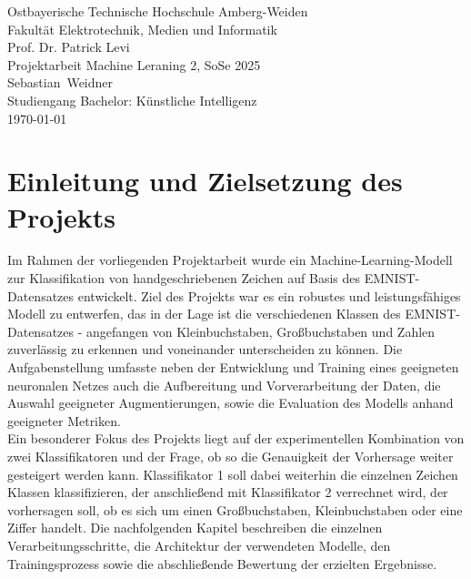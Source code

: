 \documentclass[12pt,oneside]{article}
\newcommand*{\IhrVornameEins}{Sebastian}
\newcommand*{\IhrNachnameEins}{Weidner}
\newcommand*{\IhrStudiengang}{Bachelor: Künstliche Intelligenz}
\newcommand*{\IhreArbeit}{Projektarbeit Machine Leraning 2, SoSe 2025}
\newcommand*{\IhrErstpruefer}{Prof. Dr. Patrick Levi}
\begin{document}
  \thispagestyle{empty}
  \originalTeX
  \begin{center}
 	\Large
 	Ostbayerische Technische Hochschule Amberg-Weiden\\
 Fakultät Elektrotechnik, Medien und Informatik\\[.8cm]
 \large \IhrErstpruefer\\[.8cm]
 \Large \IhreArbeit\\[.8cm]
 \large\IhrVornameEins\ \IhrNachnameEins\\[.8cm]
 \large Studiengang \IhrStudiengang\\[.8cm]
 \today\\[2.5cm]
  \end{center}
  
  \tableofcontents
  \clearpage
  \listoftables %
  \listoffigures %

  \clearpage
  
  
  \section{Einleitung und Zielsetzung des Projekts}
  Im Rahmen der vorliegenden Projektarbeit wurde ein Machine-Learning-Modell zur Klassifikation von handgeschriebenen Zeichen auf Basis des EMNIST-Datensatzes entwickelt. Ziel des Projekts war es ein robustes und leistungsfähiges Modell zu entwerfen, das in der Lage ist die verschiedenen Klassen des EMNIST-Datensatzes - angefangen von Kleinbuchstaben, Großbuchstaben und Zahlen zuverlässig zu erkennen und voneinander unterscheiden zu können. Die Aufgabenstellung umfasste neben der Entwicklung und Training eines geeigneten neuronalen Netzes auch die Aufbereitung und Vorverarbeitung der Daten, die Auswahl geeigneter Augmentierungen, sowie die Evaluation des Modells anhand geeigneter Metriken. \\
  Ein besonderer Fokus des Projekts liegt auf der experimentellen Kombination von zwei Klassifikatoren und der Frage, ob so die Genauigkeit der Vorhersage weiter gesteigert werden kann. Klassifikator 1 soll dabei weiterhin die einzelnen Zeichen Klassen klassifizieren, der anschließend mit Klassifikator 2 verrechnet wird, der vorhersagen soll, ob es sich um einen Großbuchstaben, Kleinbuchstaben oder eine Ziffer handelt.
  Die nachfolgenden Kapitel beschreiben die einzelnen Verarbeitungsschritte, die Architektur der verwendeten Modelle, den Trainingsprozess sowie die abschließende Bewertung der erzielten Ergebnisse.
  
\end{document}
